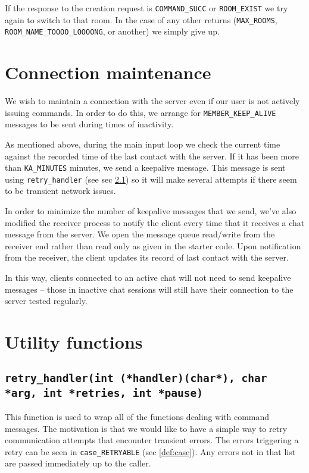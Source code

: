 \documentclass[12pt]{article}
\newcommand{\mono}[1]{\texttt{#1}}
\begin{document}
If the response to the creation request is \mono{COMMAND\_SUCC} or
\mono{ROOM\_EXIST} we try again to switch to that room. In the case of any other
returns (\mono{MAX\_ROOMS}, \mono{ROOM\_NAME\_TOOOO\_LOOOONG}, or another) we simply give up.

\section{Connection maintenance}
\label{sec:keepalive}
We wish to maintain a connection with the server even if our user is not
actively issuing commands. In order to do this, we arrange for 
\mono{MEMBER\_KEEP\_ALIVE} messages to be sent during times of inactivity.

As mentioned above, during the main input loop we check the current time
against the recorded time of the last contact with the server. If it has
been more than \mono{KA\_MINUTES} minutes, we send a keepalive message.
This message
is sent using \mono{retry\_handler} (see sec \ref{func:retry}) so it will make
several attempts if there seem to be transient network issues.

In order to minimize the number of keepalive messages that we send, we've
also modified the receiver process to notify the client every time that it
receives a chat message from the server. We open the message queue read/write
from the receiver end rather than read only as given in the starter code.
Upon notification from the receiver, the client updates its record of last
contact with the server.

In this way, clients connected to an active chat will not need to send 
keepalive messages -- those in inactive chat sessions will still have their
connection to the server tested regularly.

\section{Utility functions}
\label{sec:util}

\subsection{\mono{retry\_handler(int (*handler)(char*), char *arg, int *retries, int *pause)}}
\label{func:retry}
This function is used to wrap all of the functions dealing with command
messages. The motivation is that we would like to have a simple way to 
retry communication attempts that encounter transient errors. The errors
triggering a retry can be seen in \mono{case\_RETRYABLE} (sec \ref{def:case}).
Any errors not in that list are passed immediately up to the caller.
\end{document}
